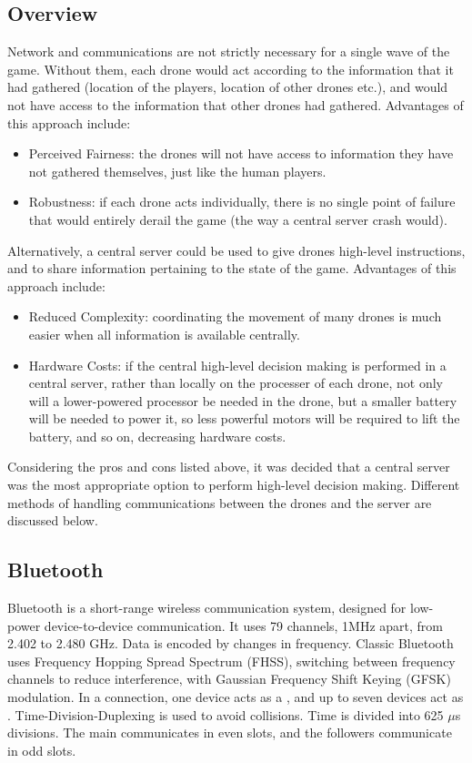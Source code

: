\documentclass{report_template_oxford}
\begin{document}
\subsection{Overview}
Network and communications are not strictly necessary for a single wave of the game. Without them, each drone would act according to the information that it had gathered (location of the players, location of other drones etc.), and would not have access to the information that other drones had gathered. Advantages of this approach include: 
\begin{itemize}
    \item Perceived Fairness: the drones will not have access to information they have not gathered themselves, just like the human players.
    \item Robustness: if each drone acts individually, there is no single point of failure that would entirely derail the game (the way a central server crash would).
\end{itemize}
Alternatively, a central server could be used to give drones high-level instructions, and to share information pertaining to the state of the game. Advantages of this approach include: 
\begin{itemize}
    \item Reduced Complexity: coordinating the movement of many drones is much easier when all information is available centrally.
    \item Hardware Costs: if the central high-level decision making is performed in a central server, rather than locally on the processer of each drone, not only will a lower-powered processor be needed in the drone, but a smaller battery will be needed to power it, so less powerful motors will be required to lift the battery, and so on, decreasing hardware costs.
\end{itemize}
Considering the pros and cons listed above, it was decided that a central server was the most appropriate option to perform high-level decision making. Different methods of handling communications between the drones and the server are discussed below.

\subsection{Bluetooth}
Bluetooth is a short-range wireless communication system, designed for low-power device-to-device communication. It uses 79 channels, 1MHz apart, from 2.402 to 2.480 GHz. Data is encoded by changes in frequency. Classic Bluetooth uses Frequency Hopping Spread Spectrum (FHSS), switching between frequency channels to reduce interference, with Gaussian Frequency Shift Keying (GFSK) modulation. In a connection, one device acts as a , and up to seven devices act as . Time-Division-Duplexing is used to avoid collisions. Time is divided into 625 \(\mu\)s divisions. The main communicates in even slots, and the followers communicate in odd slots.
\end{document}
